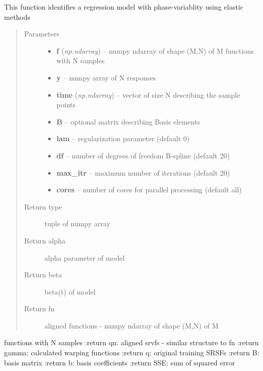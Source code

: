 \documentclass[letterpaper,10pt,english]{sphinxmanual}
\begin{document}
\begin{fulllineitems}
\label{regression:regression.elastic_regression}
This function identifies a regression model with phase-variablity
using elastic methods
\begin{quote}\begin{description}
\item[{Parameters}] \leavevmode\begin{itemize}
\item {} 
\textbf{f} (\emph{np.ndarray}) -- numpy ndarray of shape (M,N) of M functions with N samples

\item {} 
\textbf{y} -- numpy array of N responses

\item {} 
\textbf{time} (\emph{np.ndarray}) -- vector of size N describing the sample points

\item {} 
\textbf{B} -- optional matrix describing Basis elements

\item {} 
\textbf{lam} -- regularization parameter (default 0)

\item {} 
\textbf{df} -- number of degrees of freedom B-spline (default 20)

\item {} 
\textbf{max\_itr} -- maximum number of iterations (default 20)

\item {} 
\textbf{cores} -- number of cores for parallel processing (default all)

\end{itemize}

\item[{Return type}] \leavevmode
tuple of numpy array

\item[{Return alpha}] \leavevmode
alpha parameter of model

\item[{Return beta}] \leavevmode
beta(t) of model

\item[{Return fn}] \leavevmode
aligned functions - numpy ndarray of shape (M,N) of M

\end{description}\end{quote}

functions with N samples
:return qn: aligned srvfs - similar structure to fn
:return gamma: calculated warping functions
:return q: original training SRSFs
:return B: basis matrix
:return b: basis coefficients
:return SSE: sum of squared error

\end{fulllineitems}
\end{document}
